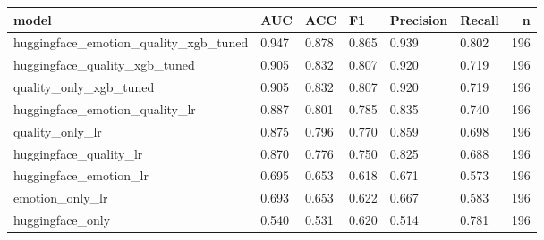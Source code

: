 \begin{tabular}{llllllr}
\toprule
model & AUC & ACC & F1 & Precision & Recall & n \\
\midrule
huggingface\_emotion\_quality\_xgb\_tuned & 0.947 & 0.878 & 0.865 & 0.939 & 0.802 & 196 \\
huggingface\_quality\_xgb\_tuned & 0.905 & 0.832 & 0.807 & 0.920 & 0.719 & 196 \\
quality\_only\_xgb\_tuned & 0.905 & 0.832 & 0.807 & 0.920 & 0.719 & 196 \\
huggingface\_emotion\_quality\_lr & 0.887 & 0.801 & 0.785 & 0.835 & 0.740 & 196 \\
quality\_only\_lr & 0.875 & 0.796 & 0.770 & 0.859 & 0.698 & 196 \\
huggingface\_quality\_lr & 0.870 & 0.776 & 0.750 & 0.825 & 0.688 & 196 \\
huggingface\_emotion\_lr & 0.695 & 0.653 & 0.618 & 0.671 & 0.573 & 196 \\
emotion\_only\_lr & 0.693 & 0.653 & 0.622 & 0.667 & 0.583 & 196 \\
huggingface\_only & 0.540 & 0.531 & 0.620 & 0.514 & 0.781 & 196 \\
\bottomrule
\end{tabular}

